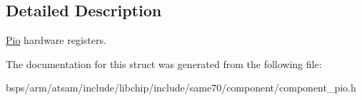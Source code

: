 \subsection{Detailed Description}
\mbox{\hyperlink{structPio}{Pio}} hardware registers. 

The documentation for this struct was generated from the following file\+:\begin{DoxyCompactItemize}
\item 
bsps/arm/atsam/include/libchip/include/same70/component/component\+\_\+pio.\+h\end{DoxyCompactItemize}
